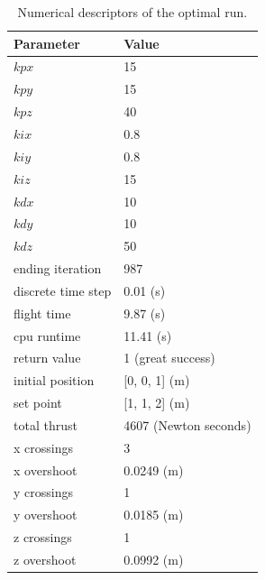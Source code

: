 \begin{table}
\label{table:optimalrun}
\begin{doublespace}
\centering
\begin{tabular}{l l}
Parameter    & Value\\
\hline
$kpx$                 & 15 \\
$kpy$                 & 15 \\
$kpz $                & 40 \\
$kix$                 & 0.8 \\
$kiy$                 & 0.8 \\
$kiz$                 & 15 \\
$kdx$                 & 10 \\
$kdy$                 & 10 \\
$kdz$                 & 50 \\
ending iteration    & 987 \\
discrete time step   & 0.01 (s)\\
flight time         & 9.87 (s) \\
cpu runtime         & 11.41 (s)\\
return value        & 1 (great success)\\
initial position    & [0, 0, 1] (m)\\
set point           & [1, 1, 2] (m) \\
total thrust        & 4607 (Newton seconds) \\
x crossings         & 3 \\
x overshoot         & 0.0249 (m) \\
y crossings         & 1 \\
y overshoot         & 0.0185 (m)\\
z crossings         & 1 \\
z overshoot         & 0.0992 (m) \\
\hline
\end{tabular}
\end{doublespace}

\caption[Numerical descriptors of the optimal run.]{Numerical descriptors of the optimal run.}
\end{table}

